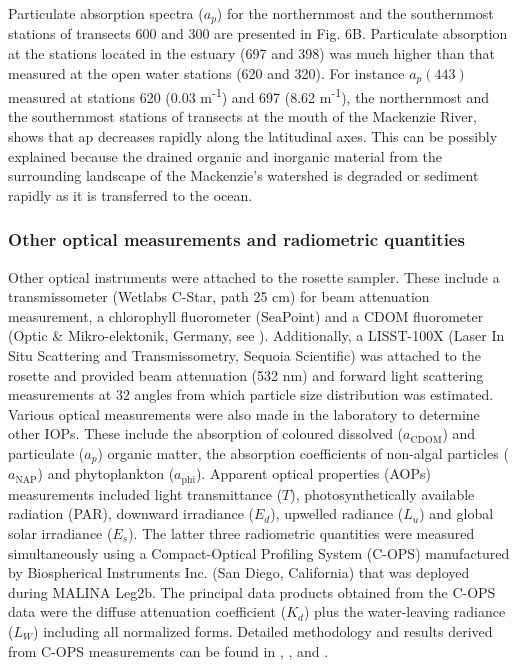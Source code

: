 \documentclass[essd, manuscript]{copernicus}
\begin{document}
Particulate absorption spectra ($a_p$) for the northernmost and the southernmost stations of transects 600 and 300 are presented in Fig. 6B. Particulate absorption at the stations located in the estuary (697 and 398) was much higher than that measured at the open water stations (620 and 320). For instance $a_p(443)$ measured at stations 620 (0.03 m\textsuperscript{-1}) and 697 (8.62 m\textsuperscript{-1}), the northernmost and the southernmost stations of transects at the mouth of the Mackenzie River, shows that ap decreases rapidly along the latitudinal axes. This can be possibly explained because the drained organic and inorganic material from the surrounding landscape of the Mackenzie's watershed is degraded or sediment rapidly as it is transferred to the ocean.

\subsubsection{Other optical measurements and radiometric quantities}

Other optical instruments were attached to the rosette sampler. These include a transmissometer (Wetlabs C-Star, path 25 cm) for beam attenuation measurement, a chlorophyll fluorometer (SeaPoint) and a CDOM fluorometer (Optic \& Mikro-elektonik, Germany, see \citet{Amon2003}). Additionally, a LISST-100X (Laser In Situ Scattering and Transmissometry, Sequoia Scientific) was attached to the rosette and provided beam attenuation (532 nm) and forward light scattering measurements at 32 angles from which particle size distribution was estimated. Various optical measurements were also made in the laboratory to determine other IOPs. These include the absorption of coloured dissolved ($a_\text{CDOM}$) and particulate ($a_p$) organic matter, the absorption coefficients of non-algal particles ($a_\text{NAP}$) and phytoplankton ($a_\text{phi}$). Apparent optical properties (AOPs) measurements included light transmittance ($T$), photosynthetically available radiation (PAR), downward irradiance ($E_d$), upwelled radiance ($L_u$) and global solar irradiance ($E_s$). The latter three radiometric quantities were measured simultaneously using a Compact-Optical Profiling System (C-OPS) manufactured by Biospherical Instruments Inc. (San Diego, California) that was deployed during MALINA Leg2b. The principal data products obtained from the C-OPS data were the diffuse attenuation coefficient ($K_d$) plus the water-leaving radiance ($L_W$) including all normalized forms. Detailed methodology and results derived from C-OPS measurements can be found in \citet{Doxaran2012},  \citet{Antoine2013}, \citet{Belanger2013b} and \citet{Hooker2013}.
\end{document}
